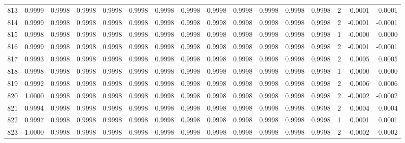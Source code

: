 \begin{tabular}{lrrrrrrrrrrrrrrr}
813 &      0.9999 &  0.9998 &  0.9998 &  0.9998 &  0.9998 &  0.9998 &  0.9998 &  0.9998 &  0.9998 &  0.9998 &   0.9998 &     0.9998 &      2 &                   -0.0001 &                    -0.0001 \\
814 &      0.9999 &  0.9998 &  0.9998 &  0.9998 &  0.9998 &  0.9998 &  0.9998 &  0.9998 &  0.9998 &  0.9998 &   0.9998 &     0.9998 &      2 &                   -0.0001 &                    -0.0001 \\
815 &      0.9998 &  0.9998 &  0.9998 &  0.9998 &  0.9998 &  0.9998 &  0.9998 &  0.9998 &  0.9998 &  0.9998 &   0.9998 &     0.9998 &      1 &                   -0.0000 &                     0.0000 \\
816 &      0.9999 &  0.9998 &  0.9998 &  0.9998 &  0.9998 &  0.9998 &  0.9998 &  0.9998 &  0.9998 &  0.9998 &   0.9998 &     0.9998 &      2 &                   -0.0001 &                    -0.0001 \\
817 &      0.9993 &  0.9998 &  0.9998 &  0.9998 &  0.9998 &  0.9998 &  0.9998 &  0.9998 &  0.9998 &  0.9998 &   0.9998 &     0.9998 &      2 &                    0.0005 &                     0.0005 \\
818 &      0.9998 &  0.9998 &  0.9998 &  0.9998 &  0.9998 &  0.9998 &  0.9998 &  0.9998 &  0.9998 &  0.9998 &   0.9998 &     0.9998 &      1 &                   -0.0000 &                     0.0000 \\
819 &      0.9992 &  0.9998 &  0.9998 &  0.9998 &  0.9998 &  0.9998 &  0.9998 &  0.9998 &  0.9998 &  0.9998 &   0.9998 &     0.9998 &      2 &                    0.0006 &                     0.0006 \\
820 &      1.0000 &  0.9998 &  0.9998 &  0.9998 &  0.9998 &  0.9998 &  0.9998 &  0.9998 &  0.9998 &  0.9998 &   0.9998 &     0.9998 &      2 &                   -0.0002 &                    -0.0002 \\
821 &      0.9994 &  0.9998 &  0.9998 &  0.9998 &  0.9998 &  0.9998 &  0.9998 &  0.9998 &  0.9998 &  0.9998 &   0.9998 &     0.9998 &      2 &                    0.0004 &                     0.0004 \\
822 &      0.9997 &  0.9998 &  0.9998 &  0.9998 &  0.9998 &  0.9998 &  0.9998 &  0.9998 &  0.9998 &  0.9998 &   0.9998 &     0.9998 &      1 &                    0.0001 &                     0.0001 \\
823 &      1.0000 &  0.9998 &  0.9998 &  0.9998 &  0.9998 &  0.9998 &  0.9998 &  0.9998 &  0.9998 &  0.9998 &   0.9998 &     0.9998 &      2 &                   -0.0002 &                    -0.0002 \\

\end{tabular}
